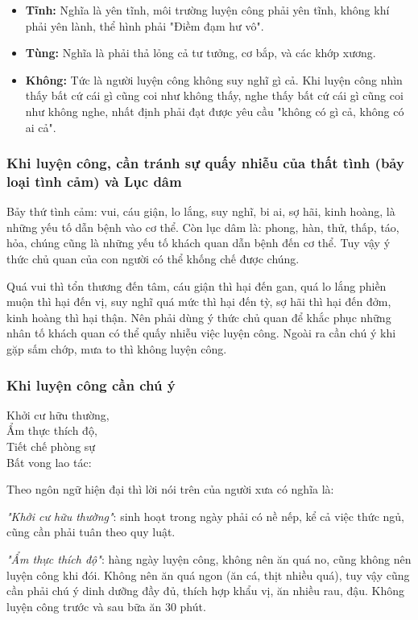 \begin{itemize}
    \item \textbf{Tĩnh:} Nghĩa là yên tĩnh, môi trường luyện công phải yên tĩnh, không khí phải yên lành, thể hình phải "Điềm đạm hư vô".
    \item \textbf{Tùng:} Nghĩa là phải thả lỏng cả tư tưởng, cơ bắp, và các khớp xương.
    \item \textbf{Không:} Tức là người luyện công không suy nghĩ gì cả. Khi luyện công nhìn thấy bất cứ cái gì cũng coi như không thấy, nghe thấy bất cứ cái gì cũng coi như không nghe, nhất định phải đạt được yêu cầu "không có gì cả, không có ai cả".
\end{itemize}

\subsubsection{Khi luyện công, cần tránh sự quấy nhiễu của thất tình (bảy loại tình cảm) và Lục dâm}

Bảy thứ tình cảm: vui, cáu giận, lo lắng, suy nghĩ, bi ai, sợ hãi, kinh hoàng, là những yếu tố dẫn bệnh vào cơ thể. Còn lục dâm là: phong, hàn, thử, thấp, táo, hỏa, chúng cũng là những yếu tố khách quan dẫn bệnh đến cơ thể. Tuy vậy ý thức chủ quan của con người có thể khống chế được chúng.

Quá vui thì tổn thương đến tâm, cáu giận thì hại đến gan, quá lo lắng phiền muộn thì hại đến vị, suy nghĩ quá mức thì hại đến tỳ, sợ hãi thì hại đến đởm, kinh hoàng thì hại thận. Nên phải dùng ý thức chủ quan để khắc phục những nhân tố khách quan có thể quấy nhiễu việc luyện công. Ngoài ra cần chú ý khi gặp sấm chớp, mưa to thì không luyện công.

\subsubsection{Khi luyện công cần chú ý}

Khởi cư hữu thường, \\
Ẩm thực thích độ, \\
Tiết chế phòng sự \\
Bất vong lao tác:

Theo ngôn ngữ hiện đại thì lời nói trên của người xưa có nghĩa là:

\textit{"Khởi cư hữu thường"}: sinh hoạt trong ngày phải có nề nếp, kể cả việc thức ngủ, cũng cần phải tuân theo quy luật.

\textit{"Ẩm thực thích độ"}: hàng ngày luyện công, không nên ăn quá no, cũng không nên luyện công khi đói. Không nên ăn quá ngon (ăn cá, thịt nhiều quá), tuy vậy cũng cần phải chú ý dinh dưỡng đầy đủ, thích hợp khẩu vị, ăn nhiều rau, đậu. Không luyện công trước và sau bữa ăn 30 phút.

